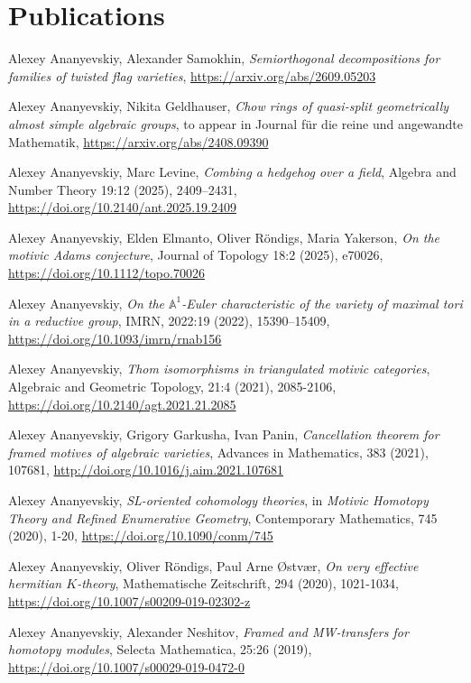 \documentclass[11pt,a4paper,sans]{moderncv}
\begin{document}
\section{Publications}
\begin{etaremune}[leftmargin=20pt]
	\item
	Alexey Ananyevskiy, Alexander Samokhin, \emph{Semiorthogonal decompositions for families of twisted flag varieties}, \url{https://arxiv.org/abs/2609.05203}
	\item
	Alexey Ananyevskiy, Nikita Geldhauser, \emph{Chow rings of quasi-split geometrically almost simple algebraic groups}, to appear in Journal für die reine und angewandte Mathematik, \url{https://arxiv.org/abs/2408.09390}
	\item
	Alexey Ananyevskiy, Marc Levine, \emph{Combing a hedgehog over a field}, Algebra and Number Theory 19:12 (2025), 2409--2431, \url{https://doi.org/10.2140/ant.2025.19.2409}	 
	\item
	Alexey Ananyevskiy, Elden Elmanto, Oliver R\"ondigs, Maria Yakerson, \emph{On the motivic Adams conjecture}, Journal of Topology 18:2 (2025), e70026, \url{https://doi.org/10.1112/topo.70026}
	\item
	Alexey Ananyevskiy, \emph{On the $\mathbb{A}^1$-Euler characteristic of the variety of maximal tori in a reductive group}, IMRN, 2022:19 (2022), 15390–15409, \url{https://doi.org/10.1093/imrn/rnab156}
	\item
	Alexey Ananyevskiy, \emph{Thom isomorphisms in triangulated motivic categories}, Algebraic and Geometric Topology, 21:4 (2021), 2085-2106, \url{https://doi.org/10.2140/agt.2021.21.2085}
	\item
	Alexey Ananyevskiy, Grigory Garkusha, Ivan Panin, \emph{Cancellation theorem for framed motives of algebraic varieties}, Advances in Mathematics, 383 (2021), 107681, \url{http://doi.org/10.1016/j.aim.2021.107681}
	\item
	Alexey Ananyevskiy, \emph{SL-oriented cohomology theories}, in \emph{Motivic Homotopy Theory and Refined Enumerative Geometry}, Contemporary Mathematics, 745 (2020), 1-20, \url{https://doi.org/10.1090/conm/745}
	\item	
	Alexey Ananyevskiy, Oliver R\"ondigs, Paul Arne \O stv\ae r, \emph{On very effective hermitian $K$-theory}, Mathematische Zeitschrift, 294 (2020), 1021-1034, \url{https://doi.org/10.1007/s00209-019-02302-z}
	\item
	Alexey Ananyevskiy, Alexander Neshitov, \emph{Framed and MW-transfers for homotopy modules}, Selecta Mathematica, 25:26 (2019), \url{https://doi.org/10.1007/s00029-019-0472-0}

\end{etaremune}
\end{document}
